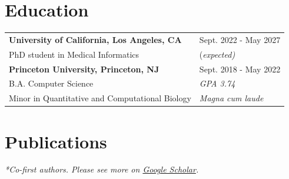 \documentclass[a4paper,12pt]{article}
\begin{document}





\section{Education}
\begin{tabularx}{\linewidth}{@{}l X@{}}	
\textbf{University of California, Los Angeles, CA} &\hfill \normalsize Sept. 2022 - May 2027 \\
PhD student in Medical Informatics&\hfill \normalsize (\textit{expected)} \\

\textbf{Princeton University, Princeton, NJ} &\hfill Sept. 2018 - May 2022 \\ 

B.A. Computer Science& \hfill  \textit{GPA 3.74} \\

 Minor in Quantitative and Computational Biology  & \hfill  \textit{Magna cum laude} \\
\end{tabularx}



\section{Publications}
\begin{refsection}
\nocite{*}
\printbibliography[heading=none]
\end{refsection}
\textit{*Co-first authors. Please see more on \href{https://scholar.google.com/citations?user=xUyQJkcAAAAJ&hl=en}{Google Scholar}.}
\end{document}
